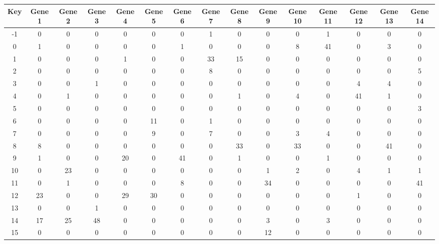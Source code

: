 \begin{tabular}{|c|c|c|c|c|c|c|c|c|c|c|c|c|c|c|}
\hline
Key & Gene 1 & Gene 2 & Gene 3 & Gene 4 & Gene 5 & Gene 6 & Gene 7 & Gene 8 & Gene 9 & Gene 10 & Gene 11 & Gene 12 & Gene 13 & Gene 14 \\
\hline
-1 & 0 & 0 & 0 & 0 & 0 & 0 & 1 & 0 & 0 & 0 & 1 & 0 & 0 & 0 \\
0 & 1 & 0 & 0 & 0 & 0 & 1 & 0 & 0 & 0 & 8 & 41 & 0 & 3 & 0 \\
1 & 0 & 0 & 0 & 1 & 0 & 0 & 33 & 15 & 0 & 0 & 0 & 0 & 0 & 0 \\
2 & 0 & 0 & 0 & 0 & 0 & 0 & 8 & 0 & 0 & 0 & 0 & 0 & 0 & 5 \\
3 & 0 & 0 & 1 & 0 & 0 & 0 & 0 & 0 & 0 & 0 & 0 & 4 & 4 & 0 \\
4 & 0 & 1 & 0 & 0 & 0 & 0 & 0 & 1 & 0 & 4 & 0 & 41 & 1 & 0 \\
5 & 0 & 0 & 0 & 0 & 0 & 0 & 0 & 0 & 0 & 0 & 0 & 0 & 0 & 3 \\
6 & 0 & 0 & 0 & 0 & 11 & 0 & 1 & 0 & 0 & 0 & 0 & 0 & 0 & 0 \\
7 & 0 & 0 & 0 & 0 & 9 & 0 & 7 & 0 & 0 & 3 & 4 & 0 & 0 & 0 \\
8 & 8 & 0 & 0 & 0 & 0 & 0 & 0 & 33 & 0 & 33 & 0 & 0 & 41 & 0 \\
9 & 1 & 0 & 0 & 20 & 0 & 41 & 0 & 1 & 0 & 0 & 1 & 0 & 0 & 0 \\
10 & 0 & 23 & 0 & 0 & 0 & 0 & 0 & 0 & 1 & 2 & 0 & 4 & 1 & 1 \\
11 & 0 & 1 & 0 & 0 & 0 & 8 & 0 & 0 & 34 & 0 & 0 & 0 & 0 & 41 \\
12 & 23 & 0 & 0 & 29 & 30 & 0 & 0 & 0 & 0 & 0 & 0 & 1 & 0 & 0 \\
13 & 0 & 0 & 1 & 0 & 0 & 0 & 0 & 0 & 0 & 0 & 0 & 0 & 0 & 0 \\
14 & 17 & 25 & 48 & 0 & 0 & 0 & 0 & 0 & 3 & 0 & 3 & 0 & 0 & 0 \\
15 & 0 & 0 & 0 & 0 & 0 & 0 & 0 & 0 & 12 & 0 & 0 & 0 & 0 & 0 \\
\hline
\end{tabular}